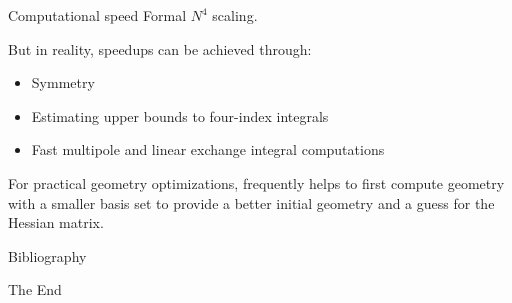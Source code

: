 \documentclass[aspectratio=169]{beamer}
\begin{document}
    \begin{frame}{Computational speed}
        Formal $N^4$ scaling.

        But in reality, speedups can be achieved through:
        \begin{itemize}
            \item Symmetry
            \item Estimating upper bounds to four-index integrals
            \item Fast multipole and linear exchange integral computations
        \end{itemize}

        For practical geometry optimizations, frequently helps to first compute geometry with a smaller basis set to provide a better initial geometry and a guess for the Hessian matrix.

    \end{frame}


    \begin{frame}[allowframebreaks]{Bibliography}
        
        
    \end{frame}



    \begin{frame}
        \Huge{\centerline{The End}}
    \end{frame}
\end{document}
